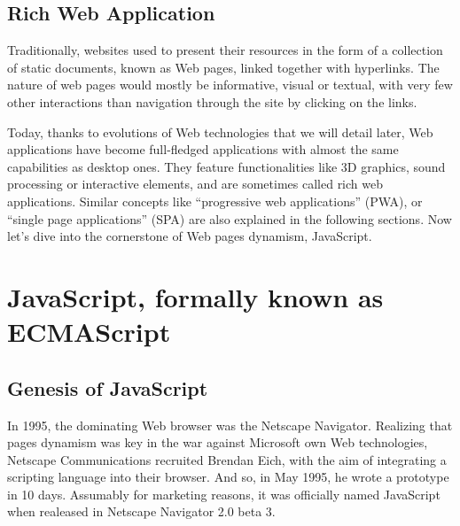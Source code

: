 \lstset{style=CodeStyle}




\subsection{Rich Web Application}%
\label{sub:rich_web_application}

Traditionally, websites used to present their resources in the form of a collection
of static documents, known as Web pages, linked together with hyperlinks.
The nature of web pages would mostly be informative, visual or textual,
with very few other interactions than navigation through the site by
clicking on the links.

Today, thanks to evolutions of Web technologies that we will detail later,
Web applications have become full-fledged applications with almost
the same capabilities as desktop ones.
They feature functionalities like 3D graphics, sound processing or interactive elements,
and are sometimes called rich web applications.
Similar concepts like ``progressive web applications'' (PWA),
or ``single page applications'' (SPA) are also explained in the following sections.
Now let's dive into the cornerstone of Web pages dynamism, JavaScript.


\section{JavaScript, formally known as ECMAScript}%
\label{sec:javascript_formally_known_as_ecmascript}

\subsection{Genesis of JavaScript}%
\label{sub:genesis_of_javascript}

In 1995, the dominating Web browser was the Netscape Navigator.
Realizing that pages dynamism was key in the war against Microsoft
own Web technologies, Netscape Communications recruited Brendan Eich,
with the aim of integrating a scripting language into their browser.
And so, in May 1995, he wrote a prototype in 10 days.
Assumably for marketing reasons, it was officially named JavaScript
when realeased in Netscape Navigator 2.0 beta 3.

